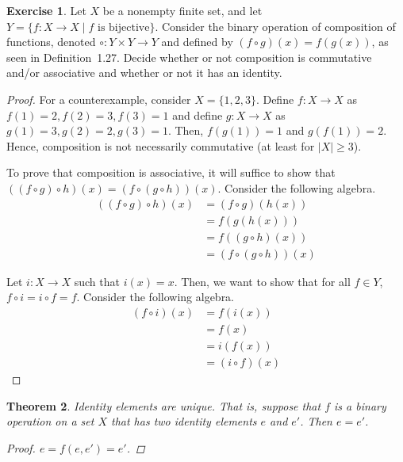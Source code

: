 \documentclass[11pt]{article}
\newcommand{\arr}{\longrightarrow}
\newtheorem{theorem}{Theorem}[section]
\theoremstyle{definition}
\newtheorem{exercise}[theorem]{Exercise}
\numberwithin{equation}{subsection}
\begin{document}
\begin{exercise}
	Let $X$ be a nonempty finite set, and let $Y=\{f\colon X \arr X \mid \mbox{$f$ is bijective}\}$.  Consider the
	binary operation of composition of functions, denoted $\circ\colon Y \times Y \arr Y$ and defined by
	$(f \circ g)(x) = f(g(x))$, as seen in Definition~1.27.  Decide whether or not composition is commutative and/or associative and whether or not it has an identity.

\begin{proof}
For a counterexample, consider $X = \{1,2,3\}$. Define $f\colon X \rightarrow X$ as $f(1)=2,f(2)=3,f(3)=1$ and define $g\colon X \rightarrow X$ as $g(1)=3,g(2)=2,g(3)=1$. Then, $f(g(1))=1$ and $g(f(1))=2$. Hence, composition is not necessarily commutative (at least for $|X|\geq 3$).

To prove that composition is associative, it will suffice to show that $((f\circ g)\circ h)(x)=(f\circ(g\circ h))(x)$. Consider the following algebra.
        \begin{align*}
            ((f\circ g)\circ h)(x) &= (f\circ g)(h(x))\\
            &= f(g(h(x)))\\
            &= f((g\circ h)(x))\\
            &= (f\circ(g\circ h))(x)
        \end{align*}\par

Let $i \colon X \rightarrow X$ such that $i(x)=x$. Then, we want to show that for all $f\in Y$, $f\circ i=i\circ f=f$. Consider the following algebra.
        \begin{align*}
            (f\circ i)(x) &= f(i(x))\\
            &= f(x)\\
            &= i(f(x))\\
            &= (i\circ f)(x)
        \end{align*}

\renewcommand\qedsymbol{QED}
\end{proof}

\end{exercise}



\begin{theorem}
	Identity elements are unique.  That is, suppose that $f$ is a binary operation on a set $X$ that has two identity elements $e$ and $e'$.  Then $e = e'$.

\begin{proof}
$e = f(e, e') = e'$. 

\renewcommand\qedsymbol{QED}
\end{proof}

\end{theorem}
\end{document}
